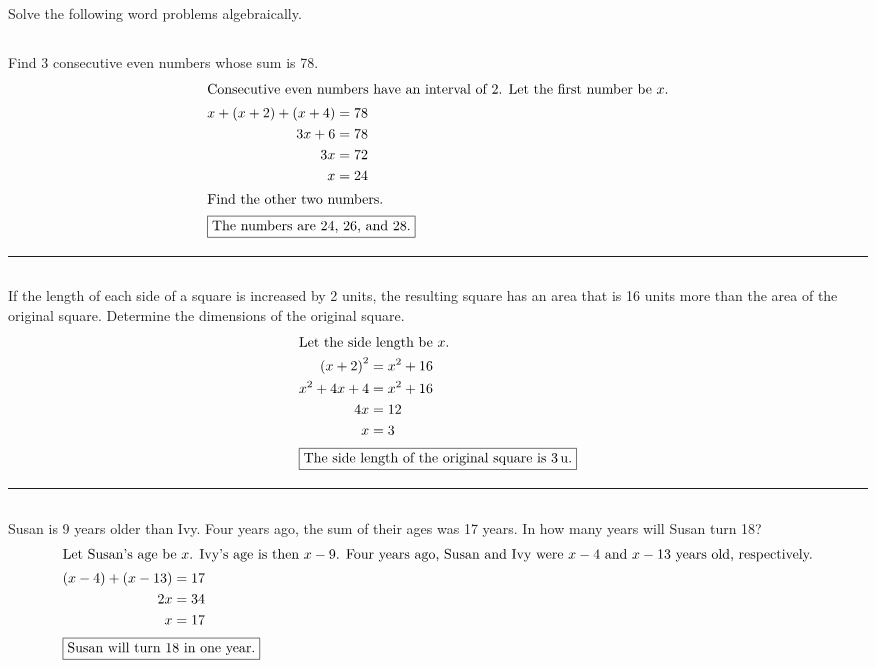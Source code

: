 


\section{}
	Solve the following word problems algebraically.

	\subsection{}
		Find 3 consecutive even numbers whose sum is 78.
		\begin{align*}
			\intertext{Consecutive even numbers have an interval of 2. Let the
			first number be $x$.}
			x + (x + 2) + (x + 4) &= 78 \\
			3x + 6 &= 78 \\
			3x &= 72 \\
			x &= 24 \\
			\intertext{Find the other two numbers.}
			\intertext{\centering\fbox{The numbers are 24, 26, and 28.}}
		\end{align*}
		\hrule{}

	\subsection{}
		If the length of each side of a square is increased by 2 units, the resulting
		square has an area that is 16 units more than the area of the original square.
		Determine the dimensions of the original square.
		\begin{align*}
			\intertext{Let the side length be $x$.}
			{(x + 2)}^2 &= x^2 + 16 \\
			x^2 + 4x + 4 &= x^2 + 16 \\
			4x &= 12 \\
			x &= 3 \\
			\intertext{\centering\fbox{The side length of the original square is \qty{3}{\unit{u}}.}}
		\end{align*}
		\hrule{}

	\subsection{}
		Susan is 9 years older than Ivy. Four years ago, the sum of their ages was 17
		years. In how many years will Susan turn 18?
		\begin{align*}
			\intertext{Let Susan's age be $x$. Ivy's age is then $x - 9$. Four years ago,
			Susan and Ivy were $x - 4$ and $x - 13$ years old, respectively.}
			(x - 4) + (x - 13) &= 17 \\
			2x &= 34 \\
			x &= 17 \\
			\intertext{\centering\fbox{Susan will turn 18 in one year.}}
		\end{align*}

